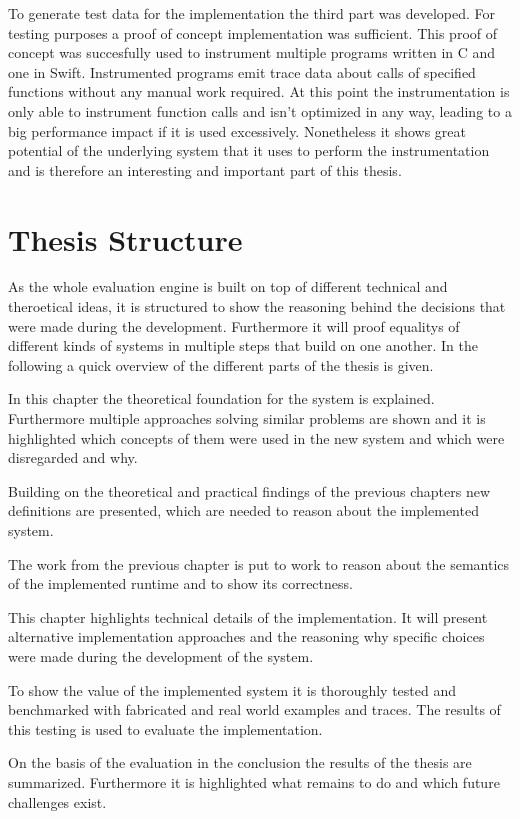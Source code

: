 To generate test data for the implementation the third part was developed.
For testing purposes a proof of concept implementation was sufficient.
This proof of concept was succesfully used to instrument multiple programs written in C and one in Swift.
Instrumented programs emit trace data about calls of specified functions without any manual work required.
At this point the instrumentation is only able to instrument function calls and isn't optimized in any way, leading to a big performance impact if it is used excessively.
Nonetheless it shows great potential of the underlying system that it uses to perform the instrumentation and is therefore an interesting and important part of this thesis.

\section{Thesis Structure}
\label{sec:intro:structure}

As the whole evaluation engine is built on top of different technical and theroetical ideas, it is structured to show
the reasoning behind the decisions that were made during the development.
Furthermore it will proof equalitys of different kinds of systems in multiple steps that build on one another.
In the following a quick overview of the different parts of the thesis is given.

\textbf{}

In this chapter the theoretical foundation for the system is explained.
Furthermore multiple approaches solving similar problems are shown and it is highlighted which concepts of them were
used in the new system and which were disregarded and why.


\textbf{}

Building on the theoretical and practical findings of the previous chapters new definitions are presented, which are needed to reason about the implemented system.

\textbf{}

The work from the previous chapter is put to work to reason about the semantics of the implemented runtime and to show its correctness.

\textbf{}

This chapter highlights technical details of the implementation.
It will present alternative implementation approaches and the reasoning why specific choices were made during the development of the system.

\textbf{}

To show the value of the implemented system it is thoroughly tested and benchmarked with fabricated and real world examples and traces.
The results of this testing is used to evaluate the implementation.

\textbf{}

On the basis of the evaluation in the conclusion the results of the thesis are summarized.
Furthermore it is highlighted what remains to do and which future challenges exist.


